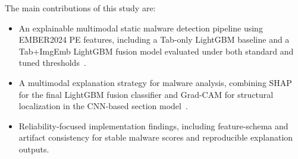 \documentclass[conference]{IEEEtran}
\begin{document}
The main contributions of this study are:
%
\begin{itemize}
\item
An explainable multimodal static malware detection pipeline using EMBER2024 PE features, including a Tab-only LightGBM baseline and a Tab+ImgEmb LightGBM fusion model evaluated under both standard and tuned thresholds~\cite{JMGPR2024}.
\item 
A multimodal explanation strategy for malware analysis, combining SHAP for the final LightGBM fusion classifier and Grad-CAM for structural localization in the CNN-based section model~\cite{SCDVPB2017,LL2017}.
\item 
Reliability-focused implementation findings, including feature-schema and artifact consistency for stable malware scores and reproducible explanation outputs.
\end{itemize}
\end{document}
